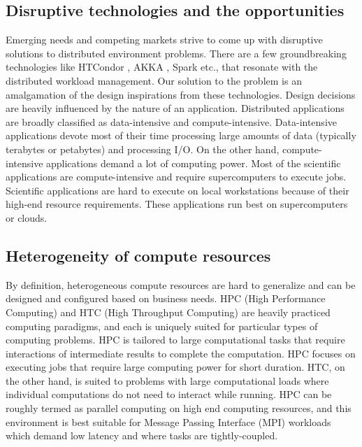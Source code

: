 \documentclass[sigconf]{acmart}
\begin{document}
\subsection{Disruptive technologies and the opportunities}
Emerging needs and competing markets strive to come up with disruptive solutions to distributed environment problems. There are a few groundbreaking technologies like HTCondor \cite{tannenbaum2001condor,thain2005distributed}, AKKA \cite{akka}, Spark \cite{zaharia2010spark} etc., that resonate with the distributed workload management. Our solution to the problem is an amalgamation of the design inspirations from these technologies. Design decisions are heavily influenced by the nature of an application. Distributed applications are broadly classified as data-intensive and compute-intensive. Data-intensive applications devote most of their time processing large amounts of data (typically terabytes or petabytes) and processing I/O. On the other hand, compute-intensive applications demand a lot of computing power. Most of the scientific applications are compute-intensive and require supercomputers to execute jobs. Scientific applications are hard to execute on local workstations because of their high-end resource requirements. These applications run best on supercomputers or clouds.

\subsection{Heterogeneity of compute resources}
By definition, heterogeneous compute resources are hard to generalize and can be designed and configured based on business needs. HPC (High Performance Computing) and HTC (High Throughput Computing) are heavily practiced computing paradigms, and each is uniquely suited for particular types of computing problems. HPC is tailored to large computational tasks that require interactions of intermediate results to complete the computation.  HPC focuses on executing jobs that require large computing power for short duration. HTC, on the other hand, is suited to problems with large computational loads where individual computations do not need to interact while running.   HPC can be roughly termed as parallel computing on high end computing resources, and this environment is best suitable for Message Passing Interface (MPI) workloads which demand low latency and where tasks are tightly-coupled.
\end{document}
